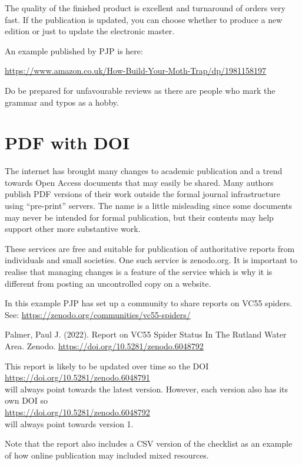 \documentclass{article}
\begin{document}
The quality of the finished product is excellent and turnaround of orders very fast.  If the publication is updated, you can choose whether to produce a new edition or just to update the electronic master.

An example published by PJP is here:

\url{https://www.amazon.co.uk/How-Build-Your-Moth-Trap/dp/1981158197}

Do be prepared for unfavourable reviews as there are people who mark the grammar and typos as a hobby.

\section{PDF with DOI}

The internet has brought many changes to academic publication and a trend towards Open Access documents that may easily be shared. Many authors publish PDF versions of their work outside the formal journal infrastructure using \enquote{pre-print} servers. The name is a little misleading since some documents may never be intended for formal publication, but their contents may help support other more substantive work.

These services are free and suitable for publication of authoritative reports from individuals and small societies. One such service is zenodo.org.  It is important to realise that managing changes is a feature of the service which is why it is different from posting an uncontrolled copy on a website. 

In this example PJP has set up a community to share reports on VC55 spiders. \\
See: \url{https://zenodo.org/communities/vc55-spiders/} 

Palmer, Paul J. (2022). Report on VC55 Spider Status In The Rutland Water Area. Zenodo. \url{https://doi.org/10.5281/zenodo.6048792}

This report is likely to be updated over time so the DOI \\ \url{https://doi.org/10.5281/zenodo.6048791} \\will always point towards the latest version. However, each version also has its own DOI so \\
\url{https://doi.org/10.5281/zenodo.6048792} \\
 will always point towards version 1.
 
 
 Note that the report also includes a CSV version of the checklist as an example of how online publication may included mixed resources.
\end{document}
